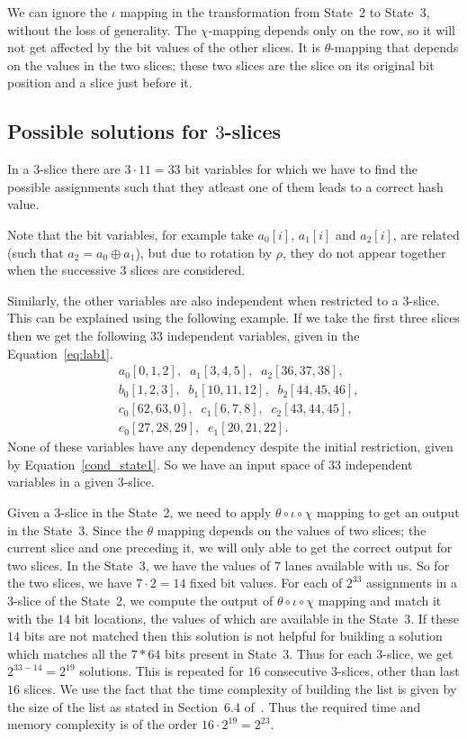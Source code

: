 We can ignore the $\iota$ mapping in the transformation from State~2 to State~3, without the loss of generality. The $\chi$-mapping depends only on the row, so it will not get affected by the bit values of the other slices. It is $\theta$-mapping that depends on the values in the two slices; these two slices are the slice on its original bit position and a slice just before it.

\subsection{Possible solutions for $3$-slices} 
In a $3$-slice there are $3 \cdot 11 = 33$ bit variables for which we have to find the possible assignments such that they atleast one of them leads to a correct hash value. 

Note that the bit variables, for example take $a_0[i]$, $a_1[i]$ and $a_2[i]$, are related (such that $a_2 = a_0 \oplus a_1$), but due to rotation by $\rho$, they do not appear together when the successive $3$ slices are considered.

Similarly, the other variables are also independent when restricted to a $3$-slice.
This can be explained using the following example. If we take the first three slices then we get the following $33$ independent variables, given in the Equation~\ref{eq:lab1}.
\begin{equation}
\label{eq:lab1}
\begin{aligned}
&a_0[0,1,2],\;\;a_1[3,4,5],\;\;a_2[36,37,38],\\
&b_0[1,2,3],\;\; b_1[10,11,12],\;\;b_2[44,45,46],\\
&c_0[62,63,0],\;\;c_1[6,7,8],\;\;c_2[43,44,45],\\
&e_0[27,28,29],\;\; e_1[20,21,22].
\end{aligned}
\end{equation}
None of these variables have any dependency despite the initial restriction, given by Equation~\ref{cond_state1}. So we have an input space of $33$ independent variables in a given $3$-slice. 

Given a $3$-slice in the State~2, we need to apply $\theta \circ \iota \circ \chi$ mapping to get an output in the State~3. Since the $\theta$ mapping depends on the values of two slices; the current slice and one preceding it, we will only able to get the correct output for two slices. In the State~3, we have the values of $7$ lanes available with us. So for the two slices, we have $7\cdot 2 = 14$ fixed bit values.
For each of $2^{33}$ assignments in a $3$-slice of the State~2, we compute the output of $\theta \circ \iota \circ \chi$ mapping and match it with the $14$ bit locations, the values of which are available in the State~3. If these $14$ bits are not matched then this solution is not helpful for building a solution which matches all the $7*64$ bits present in State~3.
Thus for each $3$-slice, we get $2^{33-14} = 2^{19}$ solutions. This is repeated for $16$ consecutive $3$-slices, other than last $16$ slices. We use the fact that the time complexity of building the list is given by the size of the list as stated in Section~6.4 of~\cite{naya2011practical}. Thus the required time and memory complexity is of the order $16 \cdot 2^{19} = 2^{23}$.

